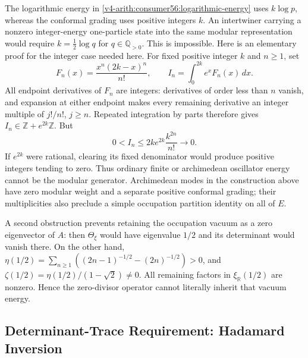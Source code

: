 \begin{remark}
\label{v4-arith:w5-b:rem:what-iv-says}
The logarithmic energy in \eqref{v4-arith:consumer56:logarithmic-energy}
uses $k\log p$, whereas the conformal grading uses positive integers
$k$. An intertwiner carrying a nonzero integer-energy one-particle
state into the same modular representation would require
$k=\tfrac12\log q$ for $q\in\mathbb Q_{>0}$. This is impossible.
Here is an elementary proof for the integer case needed here.
For fixed positive integer $k$ and $n\geq1$, set
\[
 F_n(x)=\frac{x^n(2k-x)^n}{n!},\qquad
 I_n=\int_0^{2k}e^xF_n(x)\,dx.
\]
All endpoint derivatives of $F_n$ are integers: derivatives of order
less than $n$ vanish, and expansion at either endpoint makes every
remaining derivative an integer multiple of $j!/n!$, $j\geq n$.
Repeated integration by parts therefore gives
$I_n\in\mathbb Z+e^{2k}\mathbb Z$. But
\[
 0<I_n\leq 2k e^{2k}\frac{k^{2n}}{n!}\longrightarrow0.
\]
If $e^{2k}$ were rational, clearing its fixed denominator would
produce positive integers tending to zero. Thus ordinary finite
or archimedean oscillator energy cannot be the modular generator.
Archimedean modes in the construction above have zero modular
weight and a separate positive conformal grading; their multiplicities
also preclude a simple occupation partition identity on all of $E$.

A second obstruction prevents retaining the occupation vacuum as a
zero eigenvector of $A$: then $\Theta_\xi$ would have eigenvalue
$1/2$ and its determinant would vanish there. On the other hand,
$\eta(1/2)=\sum_{n\geq1}((2n-1)^{-1/2}-(2n)^{-1/2})>0$,
and $\zeta(1/2)=\eta(1/2)/(1-\sqrt2)\ne0$. All remaining factors
in $\xi_{\mathbb R}(1/2)$ are nonzero. Hence the zero-divisor
operator cannot literally inherit that vacuum energy.
\end{remark}

\subsection{Determinant-Trace Requirement: Hadamard Inversion}
\label{v4-arith:w5-b:twist:hadamard-inversion}

